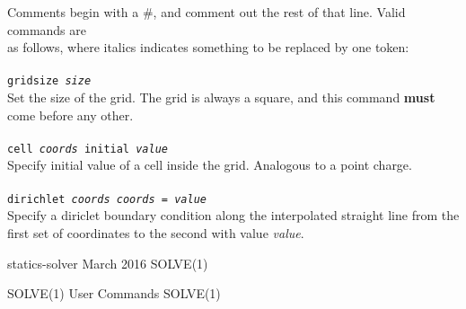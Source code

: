 \begin{tabbing}
\> Comments begin with a \#, and comment out the rest of that line. Valid commands are\\
\> as follows, where italics indicates something to be replaced by one token:\\
\\
	\> \texttt{gridsize \textit{size}}\\
	\> \> Set the size of the grid. The grid is always a square, and this command \textbf{must}\\
	\> \> come before any other.\\
	\\
	\> \texttt{cell \textit{coords} initial \textit{value}}\\
	\> \> Specify initial value of a cell inside the grid. Analogous to a point charge.\\
	\\
	\> \texttt{dirichlet \textit{coords} \textit{coords} = \textit{value}}\\
	\> \> Specify a diriclet boundary condition along the interpolated straight line from the\\
	\> \> first set of coordinates to the second with value \textit{value}.\\
\end{tabbing}
\begin{flushleft}
	statics-solver
	\hfill March 2016 \hfill
	SOLVE(1)
\end{flushleft}
\clearpage
\begin{flushleft}
	SOLVE(1)
	\hfill User Commands \hfill
	SOLVE(1)
\end{flushleft}

